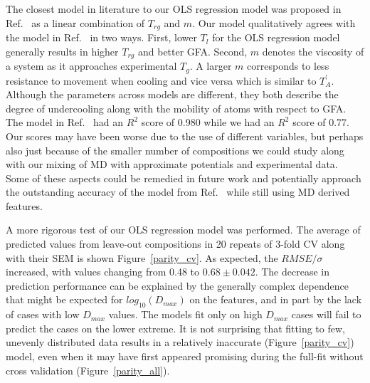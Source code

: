 \documentclass[11pt,a4paper]{article}                                %
\begin{document}
\par
The closest model in literature to our OLS regression model was proposed in Ref.~\cite{Johnson2016} as a linear combination of $T_{rg}$ and $m$. Our model qualitatively agrees with the model in Ref.~\cite{Johnson2016} in two ways. First, lower $T_{l}$ for the OLS regression model generally results in higher $T_{rg}$ and better GFA. Second, $m$ denotes the viscosity of a system as it approaches experimental $T_{g}$. A larger $m$ corresponds to less resistance to movement when cooling and vice versa which is similar to $T_{A}^{'}$. Although the parameters across models are different, they both describe the degree of undercooling along with the mobility of atoms with respect to GFA. The model in Ref.~\cite{Johnson2016} had an $R^{2}$ score of 0.980 while we had an $R^{2}$ score of 0.77. Our scores may have been worse due to the use of different variables, but perhaps also just because of the smaller number of compositions we could study along with our mixing of MD with approximate potentials and experimental data. Some of these aspects could be remedied in future work and potentially approach the outstanding accuracy of the model from Ref.~\cite{Johnson2016} while still using MD derived features.

\par
A more rigorous test of our OLS regression model was performed. The average of predicted values from leave-out compositions in 20 repeats of 3-fold CV along with their SEM is shown Figure~\ref{parity_cv}. As expected, the $RMSE/\sigma$ increased, with values changing from 0.48 to $0.68 \pm 0.042$. The decrease in prediction performance can be explained by the generally complex dependence that might be expected for $log_{10}(D_{max})$ on the features, and in part by the lack of cases with low $D_{max}$ values. The models fit only on high $D_{max}$ cases will fail to predict the cases on the lower extreme. It is not surprising that fitting to few, unevenly distributed data results in a relatively inaccurate (Figure~\ref{parity_cv}) model, even when it may have first appeared promising during the full-fit without cross validation (Figure~\ref{parity_all}).
\end{document}
